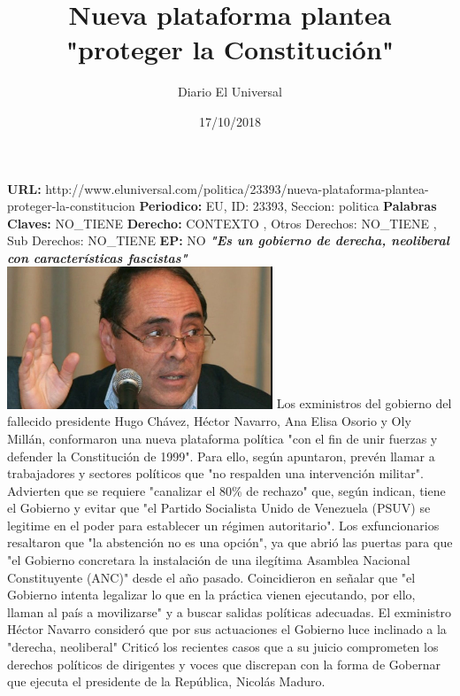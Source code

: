 \documentclass{article}%
\title{\textbf{Nueva plataforma plantea "proteger la Constitución"}}%
\author{Diario El Universal}%
\date{17/10/2018}%
\begin{document}
%
\normalsize%
\maketitle%
\textbf{URL: }%
http://www.eluniversal.com/politica/23393/nueva{-}plataforma{-}plantea{-}proteger{-}la{-}constitucion\newline%
%
\textbf{Periodico: }%
EU, %
ID: %
23393, %
Seccion: %
politica\newline%
%
\textbf{Palabras Claves: }%
NO\_TIENE\newline%
%
\textbf{Derecho: }%
CONTEXTO%
, Otros Derechos: %
NO\_TIENE%
, Sub Derechos: %
NO\_TIENE%
\newline%
%
\textbf{EP: }%
NO\newline%
\newline%
%
\textbf{\textit{"Es un gobierno de derecha, neoliberal con características fascistas"}}%
\newline%
\newline%
%
\includegraphics[width=300px]{31.jpg}%
\newline%
%
Los exministros del gobierno del fallecido presidente Hugo Chávez, Héctor Navarro, Ana Elisa Osorio y Oly Millán, conformaron una nueva plataforma política "con el fin de unir fuerzas y defender la Constitución de 1999".%
\newline%
%
Para ello, según apuntaron, prevén llamar a trabajadores y sectores políticos que "no respalden una intervención militar".\newline%
Advierten que se requiere "canalizar el 80\% de rechazo" que, según indican, tiene el Gobierno y evitar que "el Partido Socialista Unido de Venezuela (PSUV) se legitime en el poder para establecer un régimen autoritario".%
\newline%
%
Los exfuncionarios resaltaron que "la abstención no es una opción", ya que abrió las puertas para que "el Gobierno concretara la instalación de una ilegítima Asamblea Nacional Constituyente (ANC)" desde el año pasado.%
\newline%
%
Coincidieron en señalar que "el Gobierno intenta legalizar lo que en la práctica vienen ejecutando, por ello, llaman al país a movilizarse" y a buscar salidas políticas adecuadas.%
\newline%
%
El exministro Héctor Navarro consideró que por sus actuaciones el Gobierno luce inclinado a la "derecha, neoliberal"\newline%
Criticó los recientes casos que a su juicio comprometen los derechos políticos de dirigentes y voces que discrepan con la forma de Gobernar que ejecuta el presidente de la República, Nicolás Maduro.%
\newline%
%
\end{document}
